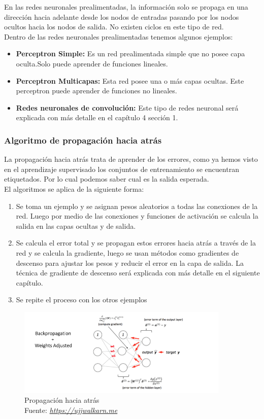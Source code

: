 En las redes neuronales prealimentadas, la información solo se propaga en una dirección hacia adelante desde los nodos de entradas pasando por los nodos ocultos hacia los nodos de salida. No existen ciclos en este tipo de red.\\
Dentro de las redes neuronales prealimentadas tenemos algunos ejemplos:
\begin{itemize}
	\item \textbf{Perceptron Simple:} Es un red prealimentada simple que no posee capa oculta.Solo puede aprender de funciones lineales.
	\item \textbf{Perceptron Multicapas:} Esta red posee una o más capas ocultas. Este perceptron puede aprender de funciones no lineales.
	\item \textbf{Redes neuronales de convolución:} Este tipo de redes neuronal será explicada con más detalle en el capítulo 4 sección 1.
\end{itemize}
\subsubsection{Algoritmo de propagación hacia atrás}
La propagación hacia atrás trata de aprender de los errores, como ya hemos visto en el aprendizaje supervisado los conjuntos de entrenamiento se encuentran etiquetados. Por lo cual podemos saber cual es la salida esperada. \\
El algoritmos se aplica de la siguiente forma:

\begin{enumerate}
	\item Se toma un ejemplo y se asignan pesos aleatorios a todas las conexiones de la red. Luego por medio de las conexiones y funciones de activación se calcula la salida en las capas ocultas y de salida.
	\item Se calcula el error total y se propagan estos errores hacia atrás a través de la red y se calcula la gradiente, luego se usan métodos como gradientes de descenso para ajustar los pesos y reducir el error en la capa de salida. La técnica de gradiente de descenso será explicada con más detalle en el siguiente capítulo.
	\item Se repite el proceso con los otros ejemplos
\end{enumerate}
\begin{figure}[H]
	\centering
	\includegraphics[width=0.9\textwidth]{Figures/backp.png}
	\caption{Propagación hacia atrás \\ Fuente:  \href{https://ujjwalkarn.me/2016/08/09/quick-intro-neural-networks/}{\textit{https://ujjwalkarn.me}}}
	\label{backpropagation}
\end{figure} 
